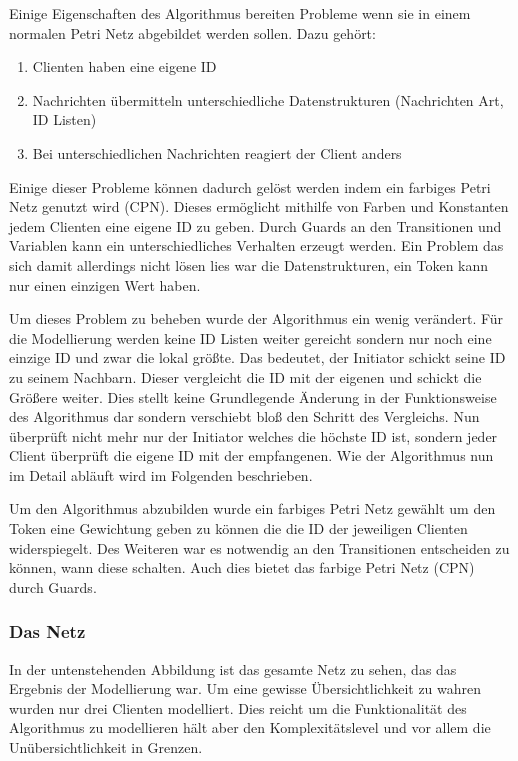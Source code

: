Einige Eigenschaften des Algorithmus bereiten Probleme wenn sie in einem normalen Petri Netz abgebildet werden sollen. Dazu gehört:
 \begin{enumerate}
 	\item Clienten haben eine eigene ID
	\item Nachrichten übermitteln unterschiedliche Datenstrukturen (Nachrichten Art, ID Listen)
	\item Bei unterschiedlichen Nachrichten reagiert der Client anders
 \end{enumerate}
		 	
Einige dieser Probleme können dadurch gelöst werden indem ein farbiges Petri Netz genutzt wird (CPN). Dieses ermöglicht mithilfe von Farben und Konstanten jedem Clienten eine eigene ID zu geben. Durch Guards an den Transitionen und Variablen kann ein unterschiedliches Verhalten erzeugt werden. Ein Problem das sich damit allerdings nicht lösen lies war die Datenstrukturen, ein Token kann nur einen einzigen Wert haben.

Um dieses Problem zu beheben wurde der Algorithmus ein wenig verändert. Für die Modellierung werden keine ID Listen weiter gereicht sondern nur noch eine einzige ID und zwar die lokal größte. Das bedeutet, der Initiator schickt seine ID zu seinem Nachbarn. Dieser vergleicht die ID mit der eigenen und schickt die Größere weiter. Dies stellt keine Grundlegende Änderung in der Funktionsweise des Algorithmus dar sondern verschiebt bloß den Schritt des Vergleichs. Nun überprüft nicht mehr nur der Initiator welches die höchste ID ist, sondern jeder Client überprüft die eigene ID mit der empfangenen. Wie der Algorithmus nun im Detail abläuft wird im Folgenden beschrieben.

Um den Algorithmus abzubilden wurde ein farbiges Petri Netz gewählt um den Token eine Gewichtung geben zu können die die ID der jeweiligen Clienten widerspiegelt. Des Weiteren war es notwendig an den Transitionen entscheiden zu können, wann diese schalten. Auch dies bietet das farbige Petri Netz (CPN) durch Guards.



\subsubsection{Das Netz}
In der untenstehenden Abbildung ist das gesamte Netz zu sehen, das das Ergebnis der Modellierung war. Um eine gewisse Übersichtlichkeit zu wahren wurden nur drei Clienten modelliert. Dies reicht um die Funktionalität des Algorithmus zu modellieren hält aber den Komplexitätslevel und vor allem die Unübersichtlichkeit in Grenzen. 


